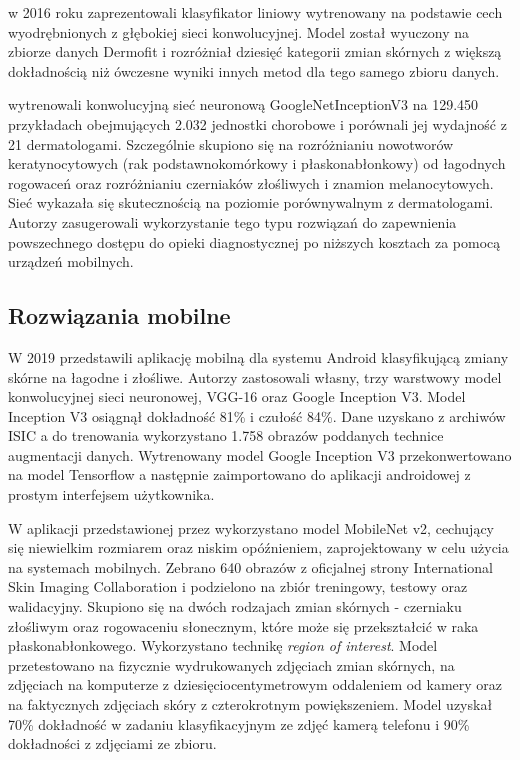 \citet{Kawahara_2016} w 2016 roku zaprezentowali klasyfikator liniowy wytrenowany na podstawie cech wyodrębnionych z głębokiej sieci konwolucyjnej.
Model został wyuczony na zbiorze danych Dermofit i rozróżniał dziesięć kategorii zmian skórnych z większą dokładnością niż ówczesne wyniki innych metod dla tego samego zbioru danych.
 
\citet{Esteva_Kuprel_Novoa_Ko_Swetter_Blau_Thrun_2017} wytrenowali konwolucyjną sieć neuronową GoogleNetInceptionV3 na 129.450 przykładach obejmujących 2.032 jednostki chorobowe i porównali jej wydajność z 21 dermatologami.
Szczególnie skupiono się na rozróżnianiu nowotworów keratynocytowych (rak podstawnokomórkowy i płaskonabłonkowy) od łagodnych rogowaceń oraz rozróżnianiu czerniaków złośliwych i znamion melanocytowych.
Sieć wykazała się skutecznością na poziomie porównywalnym z dermatologami.
Autorzy zasugerowali wykorzystanie tego typu rozwiązań do zapewnienia powszechnego dostępu do opieki diagnostycznej po niższych kosztach za pomocą urządzeń mobilnych.

\subsection{Rozwiązania mobilne}

W 2019 \citet{Ajisafe_2020} przedstawili aplikację mobilną dla systemu Android klasyfikującą zmiany skórne na łagodne i złośliwe.
Autorzy zastosowali własny, trzy warstwowy model konwolucyjnej sieci neuronowej, VGG-16 oraz Google Inception V3.
Model Inception V3 osiągnął dokładność 81\% i czułość 84\%.
Dane uzyskano z archiwów ISIC a do trenowania wykorzystano 1.758 obrazów poddanych technice augmentacji danych.
Wytrenowany model Google Inception V3 przekonwertowano na model Tensorflow a następnie zaimportowano do aplikacji androidowej z prostym interfejsem użytkownika.

W aplikacji przedstawionej przez \citet{Wirawan_2020} wykorzystano model MobileNet v2, cechujący się niewielkim rozmiarem oraz niskim opóźnieniem, zaprojektowany w celu użycia na systemach mobilnych.
Zebrano 640 obrazów z oficjalnej strony International Skin Imaging Collaboration i podzielono na zbiór treningowy, testowy oraz walidacyjny.
Skupiono się na dwóch rodzajach zmian skórnych - czerniaku złośliwym oraz rogowaceniu słonecznym, które może się przekształcić w raka płaskonabłonkowego.
Wykorzystano technikę \textit{region of interest}.
Model przetestowano na fizycznie wydrukowanych zdjęciach zmian skórnych, na zdjęciach na komputerze z dziesięciocentymetrowym oddaleniem od kamery oraz na faktycznych zdjęciach skóry z czterokrotnym powiększeniem.
Model uzyskał 70\% dokładność w zadaniu klasyfikacyjnym ze zdjęć kamerą telefonu i 90\% dokładności z zdjęciami ze zbioru.

